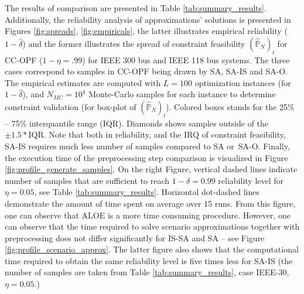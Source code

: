 The results of comparison are presented in Table \ref{tab:summary_results}. Additionally, the reliability analysis of approximations' solutions is presented in Figures \ref{fig:spreads}, \ref{fig:empiricals}, the latter illustrates empirical reliability ($1-\hat{\delta}$) and the former illustrates the spread of constraint feasibility $(\hat{\mathbb{P}}_N)_l$ for CC-OPF ($1-\eta =.99$) for IEEE 300 bus and IEEE 118 bus systems. The three cases correspond to samples in CC-OPF being drawn by SA, SA-IS and SA-O. The empirical estimates are computed with $L = 100$ optimization instances (for $1-\hat{\delta}$), and $N_{MC}=10^4$ Monte-Carlo samples for each instance to determine constraint validation (for box-plot of $(\hat{\mathbb{P}}_N)_l$). 
Colored boxes stands for the 25\% -- 75\% interquantile range (IQR). Diamonds shows samples outside of the $\pm 1.5*\text{IQR}$. 
Note that both in reliability, and the IRQ of constraint feasibility, SA-IS requires much less number of samples compared to SA or~SA-O. Finally, the execution time of the preprocessing step comparison is visualized in Figure \ref{fig:profile_generate_samples}. On the right Figure, vertical dashed lines indicate number of samples that are sufficient to reach $1-\hat{\delta}=0.99$ reliability level for $\eta=0.05$, see Table \ref{tab:summary_results}. Horizontal dot-dashed lines demonstrate the amount of time spent on average over 15 runs. From this figure, one can observe that ALOE is a more time consuming procedure. However, one can observe that the time required to solve scenario approximations together with preprocessing does not differ significantly for IS-SA and SA -- see Figure \ref{fig:profile_scenario_approx}. The latter figure also shows that the computational time required to obtain the same reliability level is five times less for SA-IS (the number of samples are taken from Table \ref{tab:summary_results}, case IEEE-30, $\eta=0.05$.)

